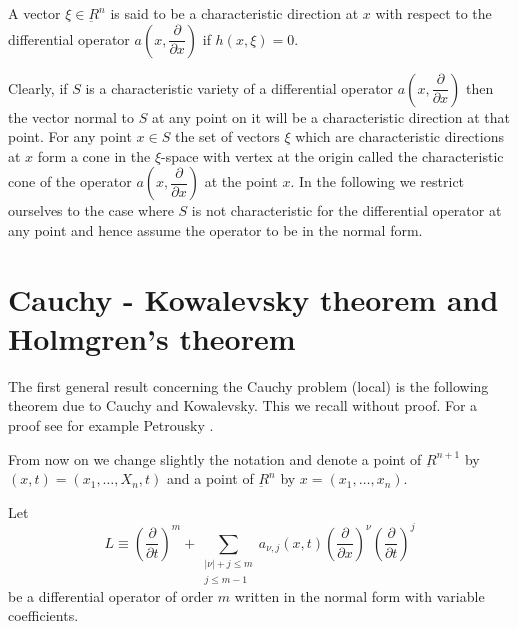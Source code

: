 A vector $\xi \in \underbar{R}^n$ is said to be a
characteristic direction at $x$ with respect to the differential
operator $a\left(x,  \dfrac{\partial}{\partial x}\right)$ if $h(x,
\xi) = 0$.  

Clearly,  if $S$ is a characteristic variety of a differential
operator $a \left(x,  \dfrac{\partial}{\partial x } \right)$ then the
vector normal to $S$ at any point on it will be a characteristic
direction at 
that point. For any point $x \in S$ the set of vectors $\xi$
which are characteristic directions at $x$ form a cone in the
$\xi$-space with vertex at the origin called the characteristic cone
of the operator $a \left(x,  \dfrac{\partial}{\partial x} \right)$ at
the point 
$x$. In the following we restrict ourselves to the case where $S$ is
not characteristic for the differential operator at any point and
hence assume the operator to be in the normal form. 

\section{Cauchy - Kowalevsky theorem and Holmgren's
  theorem}\label{chap1-sec3} %

The first general result concerning the Cauchy problem (local) is the
following theorem due to Cauchy and Kowalevsky. This we recall without
proof. For a proof see for example Petrousky \cite{key1}. 

From now on we change slightly the notation and denote a point of
$\underbar{R}^{n+1}$ by $(x,  t) = (x_1,  \ldots,  X_n,  t)$ and a
point of $\underbar{R}^n$ by $x = (x_1,  \ldots,  x_n)$. 

Let
\begin{equation*}
L \equiv \left(\frac{\partial}{\partial t}\right)^m + \sum_{\substack{|\nu | + j
    \leq m \\ j \leq m-1}} a_{\nu, j}(x, t)  \left(\frac{\partial}{\partial
  x}\right)^\nu \left(\frac{\partial}{\partial t}\right)^j
\tag{3.1}\label{chap1-eq3.1}  
\end{equation*}
be a differential operator of order $m$ written in the normal form
with variable coefficients. 

